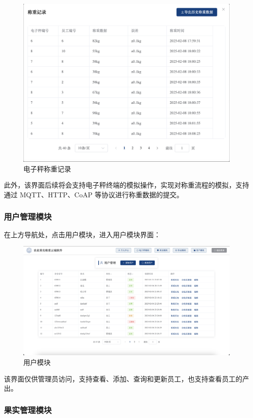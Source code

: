 \documentclass{xduugmr}
\begin{document}
\begin{figure}[H]
    \centering
    \includegraphics[width=0.8\linewidth]{../result/电子秤称重记录.png}
    \caption{电子秤称重记录}
    \label{fig:电子秤称重记录}
\end{figure}

此外，该界面后续将会支持电子秤终端的模拟操作，实现对称重流程的模拟，支持通过 MQTT、HTTP、CoAP 等协议进行称重数据的提交。

\subsubsection{用户管理模块}

在上方导航处，点击用户模块，进入用户模块界面：

\begin{figure}[H]
    \centering
    \includegraphics[width=0.8\linewidth]{../result/用户模块.png}
    \caption{用户模块}
    \label{fig:用户模块}
\end{figure}

该界面仅供管理员访问，支持查看、添加、查询和更新员工，也支持查看员工的产出。

\subsubsection{果实管理模块}
\end{document}
